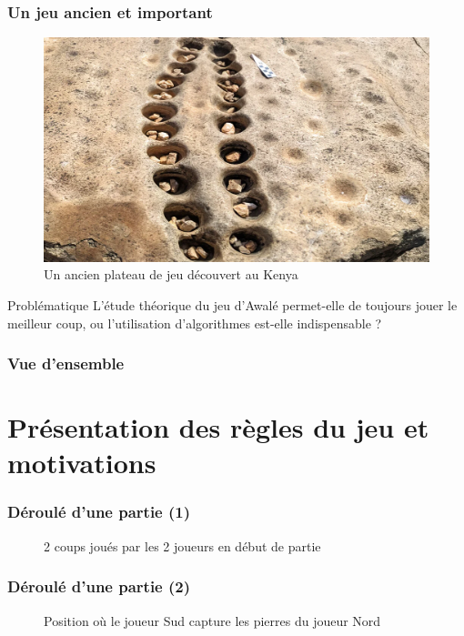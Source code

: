 \documentclass{beamer}
\begin{document}
\begin{frame}
  \frametitle{Un jeu ancien et important}
  \begin{figure}
    \centering
    \includegraphics[width=\linewidth]{ressources/ancien_plateau_jeu.png}
    \caption{Un ancien plateau de jeu découvert au Kenya}
  \end{figure}
\end{frame}


\begin{frame}
  \begin{block}{Problématique}
    L'étude théorique du jeu d'Awalé permet-elle de toujours jouer le meilleur coup, ou l'utilisation d'algorithmes est-elle indispensable ?
  \end{block}
  \frametitle{Vue d'ensemble}
  \tableofcontents
\end{frame}


\section{Présentation des règles du jeu et motivations}

\begin{frame}
  \frametitle{Déroulé d'une partie (1)}
  \begin{figure}
    \centering
    
    \caption{2 coups joués par les 2 joueurs en début de partie}
  \end{figure}
\end{frame}

\begin{frame}
  \frametitle{Déroulé d'une partie (2)}
  \begin{figure}
    \centering
    
    \caption{Position où le joueur Sud capture les pierres du joueur Nord}
  \end{figure}
\end{frame}
\end{document}
